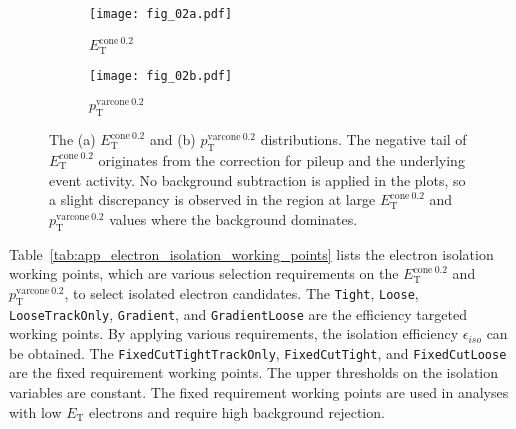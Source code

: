 \begin{figure}[htbp]
    \begin{subfigure}[b]{0.48\textwidth}
        \begin{center}
            \texttt{[image: fig\_02a.pdf]}
            \caption{$E_\mathrm{T}^\mathrm{cone\ 0.2}$}
        \end{center}
    \end{subfigure}
    \begin{subfigure}[b]{0.48\textwidth}
        \begin{center}
            \texttt{[image: fig\_02b.pdf]}
            \caption{$p_\mathrm{T}^\mathrm{varcone\ 0.2}$}
        \end{center}
    \end{subfigure}
    \caption{The (a) $E_\mathrm{T}^\mathrm{cone\ 0.2}$ and (b) $p_\mathrm{T}^\mathrm{varcone\ 0.2}$ distributions.
    The negative tail of $E_\mathrm{T}^\mathrm{cone\ 0.2}$ originates from the correction for pileup and the underlying event activity.
    No background subtraction is applied in the plots, so a slight discrepancy is observed in the region at large $E_\mathrm{T}^\mathrm{cone\ 0.2}$ and $p_\mathrm{T}^\mathrm{varcone\ 0.2}$ values where the background dominates.}
    \label{fig:app_electron_isolation_ETcone20_PTvarcone20}
\end{figure}

Table~\ref{tab:app_electron_isolation_working_points} lists the electron isolation working points, which are various selection requirements on the $E_\mathrm{T}^\mathrm{cone\ 0.2}$ and $p_\mathrm{T}^\mathrm{varcone\ 0.2}$, to select isolated electron candidates.
The \texttt{Tight}, \texttt{Loose}, \texttt{LooseTrackOnly}, \texttt{Gradient}, and \texttt{GradientLoose} are the efficiency targeted working points.
By applying various requirements, the isolation efficiency $\epsilon_{iso}$ can be obtained.
The \texttt{FixedCutTightTrackOnly}, \texttt{FixedCutTight}, and \texttt{FixedCutLoose} are the fixed requirement working points.
The upper thresholds on the isolation variables are constant.
The fixed requirement working points are used in analyses with low $E_\mathrm{T}$ electrons and require high background rejection.

